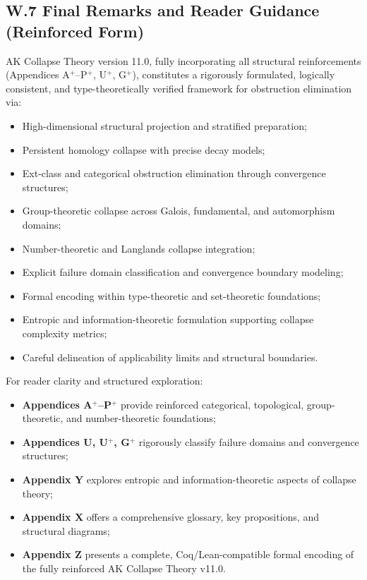 \documentclass[11pt]{article}
\begin{document}
\subsection*{W.7 Final Remarks and Reader Guidance (Reinforced Form)}

AK Collapse Theory version 11.0, fully incorporating all structural reinforcements (Appendices A$^{+}$–P$^{+}$, U$^{+}$, G$^{+}$), constitutes a rigorously formulated, logically consistent, and type-theoretically verified framework for obstruction elimination via:

\begin{itemize}
    \item High-dimensional structural projection and stratified preparation;
    \item Persistent homology collapse with precise decay models;
    \item Ext-class and categorical obstruction elimination through convergence structures;
    \item Group-theoretic collapse across Galois, fundamental, and automorphism domains;
    \item Number-theoretic and Langlands collapse integration;
    \item Explicit failure domain classification and convergence boundary modeling;
    \item Formal encoding within type-theoretic and set-theoretic foundations;
    \item Entropic and information-theoretic formulation supporting collapse complexity metrics;
    \item Careful delineation of applicability limits and structural boundaries.
\end{itemize}

For reader clarity and structured exploration:

\begin{itemize}
    \item \textbf{Appendices A$^{+}$–P$^{+}$} provide reinforced categorical, topological, group-theoretic, and number-theoretic foundations;
    \item \textbf{Appendices U, U$^{+}$, G$^{+}$} rigorously classify failure domains and convergence structures;
    \item \textbf{Appendix Y} explores entropic and information-theoretic aspects of collapse theory;
    \item \textbf{Appendix X} offers a comprehensive glossary, key propositions, and structural diagrams;
    \item \textbf{Appendix Z} presents a complete, Coq/Lean-compatible formal encoding of the fully reinforced AK Collapse Theory v11.0.
\end{itemize}
\end{document}
